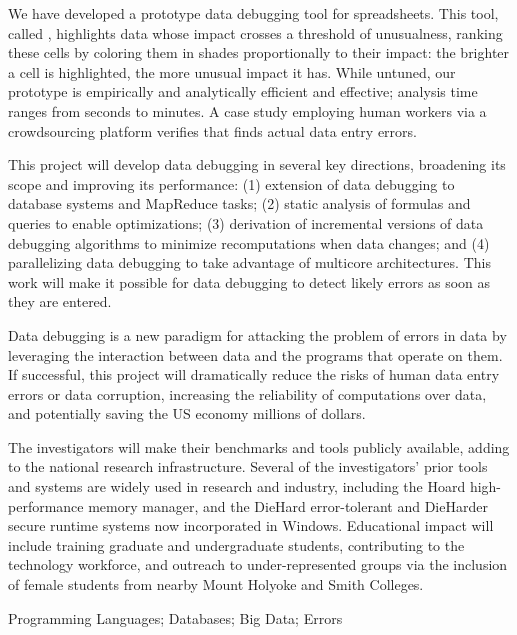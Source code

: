 We have developed a prototype data debugging tool
for spreadsheets. This tool, called
\checkcell{},
 highlights data whose impact crosses a threshold of unusualness,
ranking these cells by coloring them in shades proportionally to their
impact: the brighter a cell is highlighted, the more unusual impact it
has.  While untuned, our prototype is empirically and analytically
efficient and effective; analysis time ranges from seconds to minutes.
A case study employing human workers via a crowdsourcing platform
verifies that \checkcell{} finds actual data entry errors.

This project will develop data debugging in several key directions,
broadening its scope and improving its
performance: (1) extension of data debugging to database systems and
MapReduce tasks; (2) static analysis of formulas and queries to enable
optimizations; (3) derivation of incremental versions of data
debugging algorithms to minimize recomputations when data changes; and (4)
parallelizing data debugging to take advantage of multicore
architectures. This work will make it possible for data debugging to
detect likely errors as soon as they are entered.

\smallskip
{}
Data debugging is a new paradigm for attacking the problem of errors
in data by leveraging the interaction between data and the programs
that operate on them.  If successful, this project will dramatically
reduce the risks of human data entry errors or data corruption,
increasing the reliability of computations over data, and potentially
saving the US economy millions of dollars.

The investigators will make their benchmarks and tools publicly
available, adding to the national research infrastructure. Several of
the investigators' prior tools and systems are widely used in research
and industry, including the Hoard high-performance memory manager, and the
DieHard error-tolerant and DieHarder secure runtime systems now
incorporated in Windows. Educational impact will include training
graduate and undergraduate students, contributing to the technology
workforce, and outreach to under-represented groups via the inclusion
of female students from nearby Mount Holyoke and Smith Colleges.

\smallskip
{} Programming Languages; Databases; Big Data; Errors
